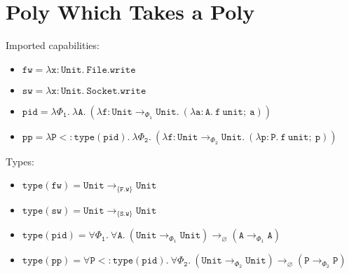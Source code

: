 \documentclass{llncs}
\newcommand{\keywadj}[1]{\mathtt{#1}}
\newcommand{\kwa}[1]{\keywadj{ #1 }}
\newcommand{\Unit}[0]{ \kwa{Unit} }
\begin{document}
\section{Poly Which Takes a Poly}

Imported capabilities:
\begin{itemize}
	\item $\kwa{fw = \lambda x: Unit.~File.write}$
	\item $\kwa{sw = \lambda x: Unit. ~Socket.write}$
	\item $\kwa{pid = \lambda \Phi_1. ~\lambda A. ~(\lambda f:Unit \rightarrow_{\Phi_1} Unit.~ (\lambda a:A.~f~unit;~a))}$
	\item $\kwa{pp = \lambda P <: type(pid). ~\lambda \Phi_2.~(\lambda f:Unit \rightarrow_{\Phi_2} Unit.~(\lambda p: P.~ f~ unit;~ p))}$
\end{itemize}

\noindent
Types:
\begin{itemize}
	\item $\kwa{type(fw) = \Unit \rightarrow_{\{F.w\}} \Unit}$
	\item $\kwa{type(sw) = \Unit \rightarrow_{\{S.w\}} \Unit}$
	\item $\kwa{type(pid) = \forall \Phi_1.~\forall A.~(Unit \rightarrow_{\Phi_1} Unit) \rightarrow_{\varnothing} (A \rightarrow_{\Phi_1} A)}$
	\item $\kwa{type(pp) = \forall P <: type(pid).~\forall \Phi_2.~(Unit \rightarrow_{\Phi_2} Unit) \rightarrow_{\varnothing} (P \rightarrow_{\Phi_2} P)}$
\end{itemize}
\end{document}
